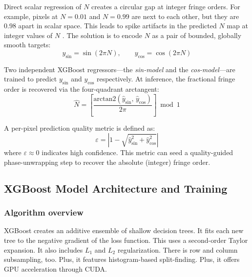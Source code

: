 \documentclass[review,12pt]{elsarticle}
\begin{document}
Direct scalar regression of $N$ creates a circular gap at integer fringe orders. For example, pixels at $N = 0.01$ and $N = 0.99$ are next to each other, but they are $0.98$ apart in scalar space. This leads to spike artifacts in the predicted $N$ map at integer values of $N$ \cite{zuo2018,ramesh2008}. The solution \cite{mardia2000} is to encode $N$ as a pair of bounded, globally smooth targets:
\begin{equation}
  y_\mathrm{sin} = \sin(2\pi N), \qquad y_\mathrm{cos} = \cos(2\pi N)
  \label{eq:encoding}
\end{equation}

Two independent XGBoost regressors---the \emph{sin-model} and the
\emph{cos-model}---are trained to predict $y_\mathrm{sin}$ and
$y_\mathrm{cos}$ respectively. At inference, the fractional fringe order is
recovered via the four-quadrant arctangent:
\begin{equation}
\hat{N} = \left[
\frac{\mathrm{arctan2}(\hat{y}_{\mathrm{sin}},\,\hat{y}_{\mathrm{cos}})}{2\pi}
\right] \bmod 1
\label{eq:recovery}
\end{equation}

A per-pixel prediction quality metric is defined as:
\begin{equation}
  \varepsilon = \left|1 - \sqrt{\hat{y}_\mathrm{sin}^2 + \hat{y}_\mathrm{cos}^2}\right|
  \label{eq:confidence}
\end{equation}
where $\varepsilon \approx 0$ indicates high confidence. This metric can
seed a quality-guided phase-unwrapping step \cite{ramesh2004,ramji2008} to
recover the absolute (integer) fringe order.

\subsection{XGBoost Model Architecture and Training}
\label{sec:xgboost}

\subsubsection{Algorithm overview}

XGBoost \cite{chen2016} creates an additive ensemble of shallow decision trees. It fits each new tree to the negative gradient of the loss function. This uses a second-order Taylor expansion. It also includes $L_1$ and $L_2$ regularization. There is row and column subsampling, too. Plus, it features histogram-based split-finding. Plus, it offers GPU acceleration through CUDA.
\end{document}
